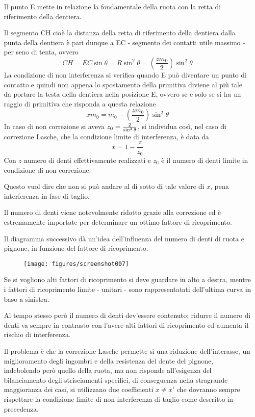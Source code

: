\documentclass[a4paper, 15pt]{article}
\begin{document}
\begin{adjustwidth}{2in}{}
				 Il punto E mette in relazione la fondamentale della ruota con la retta di riferimento della dentiera.
				 
				 Il segmento CH cioè la distanza della retta di riferimento della dentiera dalla punta della dentiera è pari dunque a EC - segmento dei contatti utile massimo - per seno di tenta, ovvero 
				 \[CH = EC\sin\theta = R\sin^2\theta = \left(\dfrac{zm_0}{2}\right)\sin^2\theta\]
				 La condizione di non interferenza si verifica quando E può diventare un punto di contatto e quindi non appena lo  spostamento della primitiva diviene al più tale da portare la testa della dentiera nella posizione E, ovvero se e solo se si ha un raggio di primitiva  che risponda a questa relazione 
				 \[xm_0 = m_0 - \left(\dfrac{zm_0}{2}\right)\sin^2\theta\]
				 In caso di non correzione si aveva $z_0 = {2\over\sin^2\theta}$, si individua così, nel caso di correzione Lasche, che la condizione limite di interferenza, è data da 
				 \[x = 1 - \dfrac{z}{z_0}\]
				 Con $z$ numero di denti effettivamente realizzati e $z_0$ è il numero di denti limite in condizione di non correzione. \newline 
				 
				 Questo vuol dire che non si può andare al di sotto di tale valore di $x$, pena interferenza in fase di taglio. \newline 
				 
				 Il numero di denti viene notevolmente ridotto grazie alla correzione ed è estremamente importate per determinare un ottimo fattore di ricoprimento. 
				 
				 Il diagramma successivo dà un'idea dell'influenza del numero di denti di ruota e pignone, in funzione del fattore di ricoprimento. 
				 \begin{figure}[H]
				 	\centering
				 	\texttt{[image: figures/screenshot007]}
				 	\label{fig:screenshot007}
				 \end{figure}
				 Se si vogliono alti fattori di ricoprimento si deve guardare in alto a destra, mentre i fattori di ricoprimento limite - unitari - sono rappresentatati dell'ultima curva in baso a sinistra. 
				 
				 Al tempo stesso però il numero di denti dev'essere contenuto: ridurre il numero di denti va sempre in contrasto con l'avere alti fattori di ricoprimento ed aumenta il rischio di interferenza. \newline 
				 
				 Il problema è che la correzione Lasche permette sì una riduzione dell'interasse, un miglioramento degli ingombri e della resistenza del dente del pignone, indebolendo però quello della ruota, ma non risponde all'esigenza del bilanciamento degli strisciamenti specifici, di conseguenza nella stragrande maggioranza dei casi, si utilizzano due coefficienti $x\ne x'$ che dovranno sempre rispettare la condizione limite di non interferenza di taglio come descritto in precedenza. \newline
				 

\end{adjustwidth}
\end{document}
